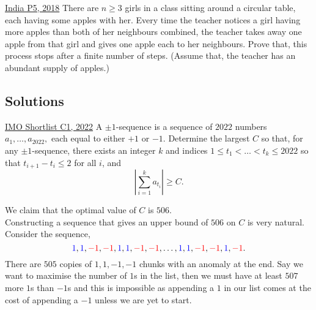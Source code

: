 \begin{problem}{4}{\href{https://artofproblemsolving.com/community/q1h1578516p32946994}{India P5, 2018}}
	There are $n\ge 3$ girls in a class sitting around a circular table, each having some apples with her. Every time the teacher notices a girl having more apples than both of her neighbours combined, the teacher takes away one apple from that girl and gives one apple each to her neighbours. Prove that, this process stops after a finite number of steps. (Assume that, the teacher has an abundant supply of apples.)
\end{problem}

\newpage
\subsection{Solutions}
\begin{problem}{1}{\href{https://artofproblemsolving.com/community/q1h3107334p34892180}{IMO Shortlist C1, 2022}} 
A $\pm 1$-sequence is a sequence of $2022$ numbers $a_1, \ldots, a_{2022},$ each equal to either $+1$ or $-1$. Determine the largest $C$ so that, for any $\pm 1$-sequence, there exists an integer $k$ and indices $1 \le t_1 < \ldots < t_k \le 2022$ so that $t_{i+1} - t_i \le 2$ for all $i$, and$$\left| \sum_{i = 1}^{k} a_{t_i} \right| \ge C.$$
	\begin{solution} We claim that the optimal value of $C$ is $506$.\\
Constructing a sequence that gives an upper bound of $506$ on $C$ is very natural. Consider the sequence,
$$\textcolor{blue}{1},\textcolor{blue}{1}, \textcolor{red}{-1}, \textcolor{red}{-1}, \textcolor{blue}{1},\textcolor{blue}{1}, \textcolor{red}{-1}, \textcolor{red}{-1},\ldots, \textcolor{blue}{1},\textcolor{blue}{1}, \textcolor{red}{-1}, \textcolor{red}{-1},\textcolor{blue}{1}, \textcolor{red}{-1}.$$There are $505$ copies of $1,1,-1, -1$ chunks with an anomaly at the end. Say we want to maximise the number of $1$s in the list, then we must have at least $507$ more $1$s than $-1$s and this is impossible as appending a $1$ in our list comes at the cost of appending a $-1$ unless we are yet to start.\\


\end{solution}
\end{problem}
